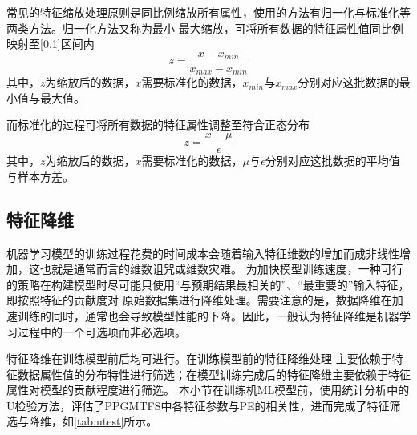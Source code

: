 常见的特征缩放处理原则是同比例缩放所有属性，使用的方法有归一化与标准化等两类方法。归一化方法又称为最小-最大缩放，可将所有数据的特征属性值同比例映射至[0,1]区间内
\begin{equation}
  \label{equ:maxmin}
  z = \frac{x - x_{min}}{x_{max}-x_{min}}
\end{equation}
其中，$z$为缩放后的数据，$x$需要标准化的数据，$x_{min}$与$x_{max}$分别对应这批数据的最小值与最大值。

而标准化的过程可将所有数据的特征属性调整至符合正态分布
\begin{equation}
  \label{equ:normalization}
  z = \frac{x - \mu}{\epsilon}
\end{equation}
其中，$z$为缩放后的数据，$x$需要标准化的数据，$\mu$与$\epsilon$分别对应这批数据的平均值与样本方差。

\subsection{特征降维}
机器学习模型的训练过程花费的时间成本会随着输入特征维数的增加而成非线性增加，这也就是通常而言的维数诅咒或维数灾难。
为加快模型训练速度，一种可行的策略在构建模型时尽可能只使用“与预期结果最相关的”、“最重要的”输入特征，即按照特征的贡献度对
原始数据集进行降维处理。需要注意的是，数据降维在加速训练的同时，通常也会导致模型性能的下降。因此，一般认为特征降维是机器学习过程中的一个可选项而非必选项。

特征降维在训练模型前后均可进行。在训练模型前的特征降维处理
主要依赖于特征数据属性值的分布特性进行筛选；在模型训练完成后的特征降维主要依赖于特征属性对模型的贡献程度进行筛选。
本小节在训练机ML模型前，使用统计分析中的U检验方法，评估了PPGMTFS中各特征参数与PE的相关性，进而完成了特征筛选与降维，如\autoref{tab:utest}所示。


